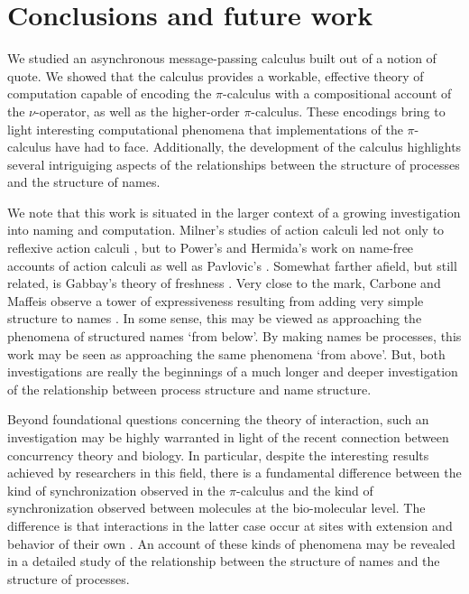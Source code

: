 \documentclass[]{entcs}
\newcommand{\pic}{$\pi$-calculus}
\begin{document}
\section{Conclusions and future work}

We studied an asynchronous message-passing calculus built out of a
notion of quote. We showed that the calculus provides a workable,
effective theory of computation capable of encoding the {\pic} with a
compositional account of the $\nu$-operator, as well as the
higher-order {\pic}. These encodings bring to light interesting
computational phenomena that implementations of the {\pic} have had to
face. Additionally, the development of the calculus highlights several
intriguiging aspects of the relationships between the structure of
processes and the structure of names.

We note that this work is situated in the larger context of a growing
investigation into naming and computation. Milner's studies of action
calculi led not only to reflexive action calculi
\cite{DBLP:conf/tacs/Milner97}, but to Power's and Hermida's work on
name-free accounts of action calculi
\cite{DBLP:conf/concur/HermidaP95} as well as Pavlovic's \cite{PavlovicD:CLNA}. 
Somewhat farther afield, but still
related, is Gabbay's theory of freshness \cite{GabbayMJ:picfm}. Very
close to the mark, Carbone and Maffeis observe a tower of
expressiveness resulting from adding very simple structure to names
\cite{polysync}. In some sense, this may be viewed as approaching the
phenomena of structured names `from below'. By making names be
processes, this work may be seen as approaching the same phenomena
`from above'. But, both investigations are really the beginnings of a
much longer and deeper investigation of the relationship between
process structure and name structure.

Beyond foundational questions concerning the theory of interaction,
such an investigation may be highly warranted in light of the recent
connection between concurrency theory and biology. In particular,
despite the interesting results achieved by researchers in this field,
there is a fundamental difference between the kind of synchronization
observed in the {\pic} and the kind of synchronization observed
between molecules at the bio-molecular level. The difference is that
interactions in the latter case occur at sites with extension and
behavior of their own \cite{Fontana}. An account of these kinds of
phenomena may be revealed in a detailed study of the relationship
between the structure of names and the structure of processes.
\end{document}
